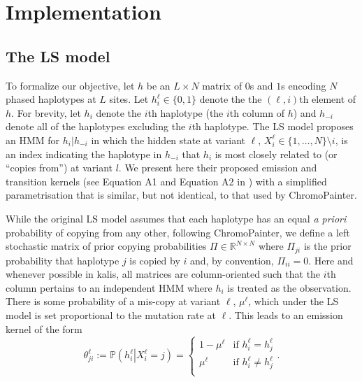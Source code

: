 \documentclass[pdflatex,referee,lineno,sn-nature]{sn-jnl}%
\newcommand{\pkg}[1]{{\fontseries{m}\fontseries{b}\selectfont #1}}
\begin{document}
\section*{Implementation}

\subsection*{The LS model}
\label{sec:lsmodel}

To formalize our objective, let \(h\) be an \(L \times N\) matrix of \(0\)s and \(1\)s encoding \(N\) phased haplotypes at \(L\) sites.
Let \(h_i^{\ell} \in \{0,1\}\) denote the the \((\ell,i)\)th element of \(h\).
For brevity, let \(h_i\) denote the \(i\)th haplotype (the \(i\)th column of \(h\)) and \(h_{-i}\) denote all of the haplotypes excluding the \(i\)th haplotype.
The LS model proposes an HMM for \(h_i | h_{-i}\) in which the hidden state at variant \(\ell\), \(X^{\ell}_i \in \{1,\dots,N\} \setminus i\), is an index indicating the haplotype in \(h_{-i}\) that \(h_i\) is most closely related to (or ``copies from'') at variant \(l\).
We present here their proposed emission and transition kernels (see Equation A1 and Equation A2 in \cite{Li2213}) with a simplified parametrisation that is similar, but not identical, to that used by ChromoPainter.

While the original LS model assumes that each haplotype has an equal \emph{a priori} probability of copying from any other, following ChromoPainter, we define a left stochastic matrix of prior copying probabilities \(\Pi \in \mathbb{R}^{N \times N}\) where \(\Pi_{ji}\) is the prior probability that haplotype \(j\) is copied by \(i\) and, by convention, \(\Pi_{ii} = 0\).
Here and whenever possible in \pkg{kalis}, all matrices are column-oriented such that the \(i\)th column pertains to an independent HMM where \(h_i\) is treated as the observation.
There is some probability of a mis-copy at variant \(\ell\), \(\mu^{\ell}\), which under the LS model is set proportional to the mutation rate at \(\ell\).
This leads to an emission kernel of the form
\begin{equation}
	\theta_{ji}^{\ell} := \mathbb{P}\left(h_{i}^\ell \left| X_{i}^{\ell} = j \right. \right)
	= \begin{cases}
		1 - \mu^{\ell} & \text{if } h_{i}^\ell = h_j^\ell \\
		\mu^{\ell} & \text{if } h_{i}^\ell \neq h_j^\ell \\
	\end{cases} .
	\label{eq:emission}
\end{equation}
\end{document}
